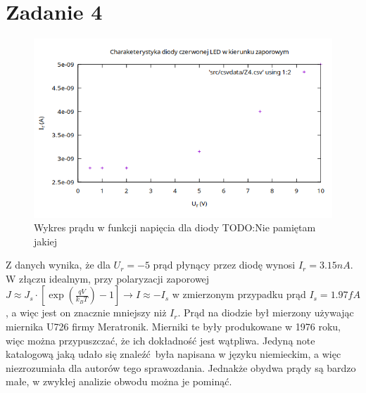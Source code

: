 \documentclass{article}
\begin{document}
\section{Zadanie 4}
\begin{figure}[h]
\centering
  \includegraphics[scale=0.5]{./img/Z4.png}
  \caption{Wykres prądu w funkcji napięcia dla diody TODO:Nie pamiętam jakiej}
\end{figure}
\centering
Z danych wynika, że dla $U_r = -5$ prąd płynący przez diodę wynosi $I_r=3.15nA$.
W złączu idealnym, przy polaryzacji zaporowej $ J \approx J_s \cdot [\exp{(\frac{qV}{k_BT})}-1] \rightarrow 
I \approx -I_s$ w zmierzonym przypadku prąd $I_s=1.97fA$, a więc jest on znacznie mniejszy niż $I_r$. 
Prąd na diodzie był mierzony używając miernika U726 firmy Meratronik. Mierniki te były produkowane w 1976 roku,
więc można przypuszczać, że ich dokładność jest wątpliwa. Jedyną note katalogową jaką udało się znaleźć była
napisana w języku niemieckim, a więc niezrozumiała dla autorów tego sprawozdania.
Jednakże obydwa prądy są bardzo małe, w zwykłej analizie obwodu można je pominąć. 
\end{document}
